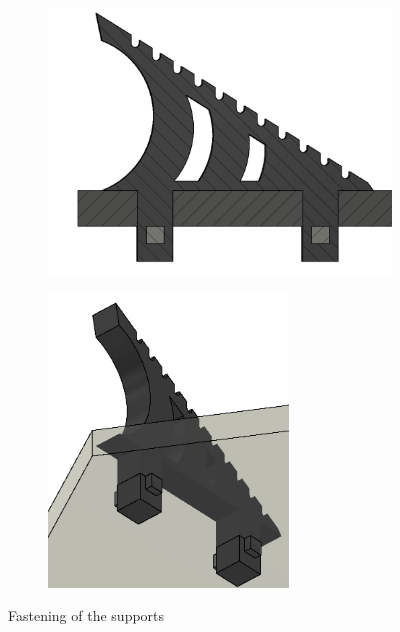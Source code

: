\begin{figure}[h!]
    \begin{subfigure}{0.5\textwidth}
        \centering
        \includegraphics[width=\textwidth]{kassandra/resources/endeMeinerHoffnungInSemi2DStayer.PNG}
    \end{subfigure}%
    \begin{subfigure}{0.5\textwidth}
        \centering
        \includegraphics[width=0.7\textwidth]{kassandra/resources/endeMeinerHoffnungIn3DStayer.PNG}
    \end{subfigure}
    \centering
    \caption{Fastening of the supports}
    \label{fig:stayer}
\end{figure}


